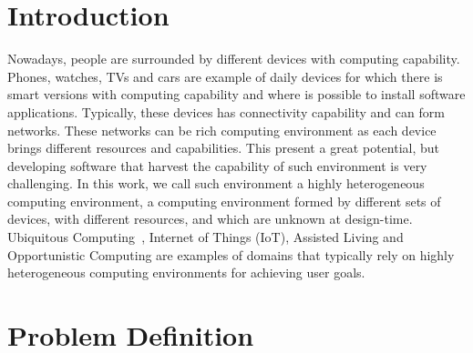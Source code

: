 \section{Introduction}
Nowadays, people are surrounded by different devices with computing capability. Phones, watches, TVs and cars are example of daily devices for which there is smart versions with computing capability and where is possible to install software applications. Typically, these devices has connectivity capability and can form networks. These networks can be rich computing environment as each device brings different resources and capabilities. This present a great potential, but developing software that harvest the capability of such environment is very challenging.
In this work, we call such environment a highly heterogeneous computing environment, a computing environment formed by different sets of devices, with different resources, and which are unknown at design-time. Ubiquitous Computing~\cite{bell_yesterdays_2007}, Internet of Things (IoT)\cite{atzori_internet_2010}, Assisted Living\cite{kleinberger_ambient_2007} and Opportunistic Computing\cite{smaldone_improving_2011} are examples of domains that typically rely on highly heterogeneous computing environments for achieving user goals.

\section{Problem Definition}



